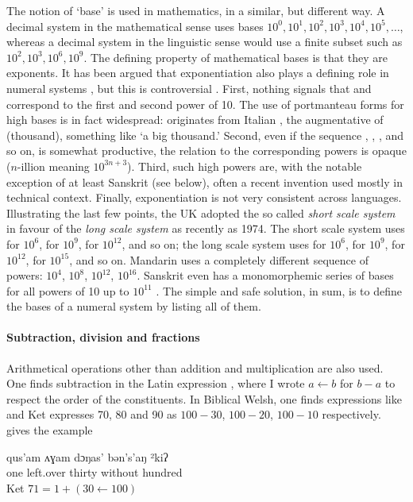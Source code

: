 \documentclass{../src/bcthesispart}
\begin{document}
The notion of ‘base’ is used in mathematics, in a similar, but different way.
A decimal system in the mathematical sense uses bases $10^0, 10^1, 10^2, 10^3, 10^4, 10^5, \dots $, whereas a decimal system in the linguistic sense would use a finite subset such as $10^2, 10^3, 10^6, 10^9$.
The defining property of mathematical bases is that they are exponents.
It has been argued that exponentiation also plays a defining role in numeral systems \parencite[e.g.][]{Hurford1975}, but this is controversial \parencite[see][]{Comrie1999,Comrie2013}. 
First, nothing signals that  and  correspond to the first and second power of 10.
The use of portmanteau forms for high bases is in fact widespread:  originates from Italian , the augmentative of  (thousand), something like ‘a big thousand.’
Second, even if the sequence , , , and so on, is somewhat productive, the relation to the corresponding powers is opaque ($n$-illion meaning $10^{3n+3}$). 
Third, such high powers are, with the notable exception of at least Sanskrit (see below), often a recent invention used mostly in technical context. 
Finally, exponentiation is not very consistent across languages.
Illustrating the last few points, the UK adopted the so called \emph{short scale system} in favour of the \emph{long scale system} as recently as 1974.
The short scale system uses  for $10^6$,  for $10^9$,  for $10^{12}$, and so on; the long scale system uses  for $10^6$,  for $10^9$,  for $10^{12}$,  for $10^{15}$, and so on. 
Mandarin uses a completely different sequence of powers: $10^4$, $10^8$, $10^{12}$, $10^{16}$.
Sanskrit even has a monomorphemic series of bases for all powers of 10 up to $10^{11}$ \parencite{Comrie2011}.
The simple and safe solution, in sum, is to define the bases of a numeral system by listing all of them.




\paragraph{Subtraction, division and fractions}

Arithmetical operations other than addition and multiplication are also used. One finds subtraction in the Latin expression , where I wrote $a \leftarrow b$ for $b-a$ to respect the order of the constituents.
In Biblical Welsh, one finds expressions like  and Ket expresses 70, 80 and 90 as $100-30$, $100-20$, $100-10$ respectively.
\textcite{Comrie2011} gives the example
\begin{exe}
	\ex\gll%
	qus’am ʌɣam dɔŋas’ bən’s’aŋ ²kiʔ\\
	one left.over thirty without hundred 
	\\\hfill Ket
	\glt $71 = 1 + (30 \leftarrow 100)$
\end{exe}
\end{document}
